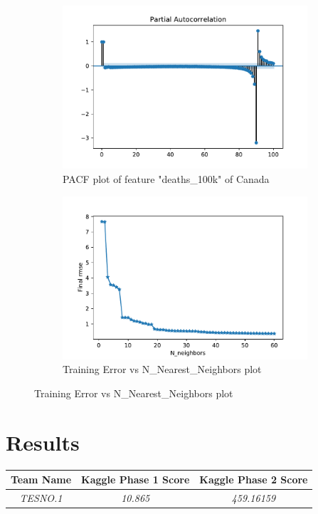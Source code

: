 \begin{figure}
\centering
\begin{subfigure}{.5\textwidth}
  \centering
  \includegraphics[width=.9\linewidth]{figs/pacf_lag_plot_CA.pdf}
  \caption{PACF plot of feature "deaths\_100k" of Canada}
  \label{fig:sub1}
\end{subfigure}%
\begin{subfigure}{.5\textwidth}
  \centering
  \includegraphics[width=.9\linewidth]{figs/Find_N_plot_d11_CA_train.pdf}
  \caption{Training Error vs N\_Nearest\_Neighbors plot }
  \label{fig:sub2}
\end{subfigure}
\label{fig:test}
\end{figure}
\section{Results}

\begin{center}
 \begin{tabular}{|c | c | c |} 
 \hline
 Team Name & Kaggle Phase 1 Score & Kaggle Phase 2 Score  \\ [0.5ex]
 \hline\hline
 \emph{TESNO.1} & \emph{10.865}  & \emph{459.16159}  \\
 \hline
\end{tabular}
\end{center}

